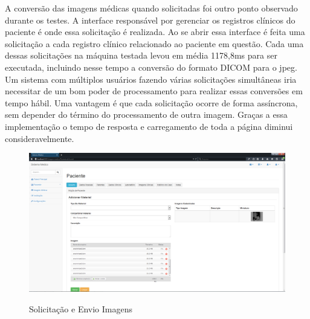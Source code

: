 A conversão das imagens médicas quando solicitadas foi outro ponto observado durante os testes. A interface responsável por gerenciar os registros clínicos do paciente é onde essa solicitação é realizada. Ao se abrir essa interface é feita uma solicitação a cada registro clínico relacionado ao paciente em questão. Cada uma dessas solicitações na máquina testada levou em média 1178,8ms para ser executada, incluindo nesse tempo a conversão do formato DICOM para o jpeg. Um sistema com  múltiplos usuários fazendo várias solicitações simultâneas iria necessitar de um bom poder de processamento para realizar essas conversões em tempo hábil. Uma vantagem é que cada solicitação ocorre de forma assíncrona, sem depender do término do processamento de outra imagem. Graças a essa implementação o tempo de resposta e carregamento de toda a página diminui consideravelmente.

\begin{figure}[ht]
	\centering	
	\caption[\hspace{0.1cm}Imagens Clínicas.]{Solicitação e Envio Imagens}
	\vspace{-0.4cm}
	\includegraphics[width=1.0\textwidth]{figuras/envioMultiplasImagens15mb.png}
	\vspace{-0.2cm}
	\label{fig:figura3}
\end{figure}

